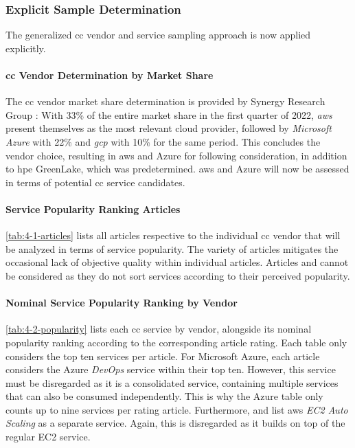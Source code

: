 \subsubsection{Explicit Sample Determination}

The generalized \ac{cc} vendor and service sampling approach is now applied explicitly. 

\paragraph{\acs{cc} Vendor Determination by Market Share}
The \ac{cc} vendor market share determination is provided by Synergy Research Group \cite{noauthor_huge_2022}: With 33\% of the entire market share in the first quarter of 2022, \textit{\acf{aws}} present themselves as the most relevant cloud provider, followed by \textit{Microsoft Azure} with 22\% and \textit{\acf{gcp}} with 10\% for the same period. This concludes the vendor choice, resulting in \ac{aws} and Azure for following consideration, in addition to \acs{hpe} GreenLake, which was predetermined. \acs{aws} and Azure will now be assessed in terms of potential \ac{cc} service candidates.

\paragraph{Service Popularity Ranking Articles} 
\autoref{tab:4-1-articles} lists all articles respective to the individual \ac{cc} vendor that will be analyzed in terms of service popularity. The variety of articles mitigates the occasional lack of objective quality within individual articles. Articles \cite{noauthor_aws_2022} and \cite{kumar_list_2021} cannot be considered as they do not sort services according to their perceived popularity.


\paragraph{Nominal Service Popularity Ranking by Vendor}
\autoref{tab:4-2-popularity} lists each \ac{cc} service by vendor, alongside its nominal popularity ranking according to the corresponding article rating. Each table only considers the top ten services per article. For Microsoft Azure, each article considers the Azure \textit{DevOps} service within their top ten. However, this service must be disregarded as it is a consolidated service, containing multiple services that can also be consumed independently. This is why the Azure table only counts up to nine services per rating article. Furthermore, \cite{dent_revealed_nodate} and \cite{house_top_2021} list \ac{aws} \textit{EC2 Auto Scaling} as a separate service. Again, this is disregarded as it builds on top of the regular EC2 service.


